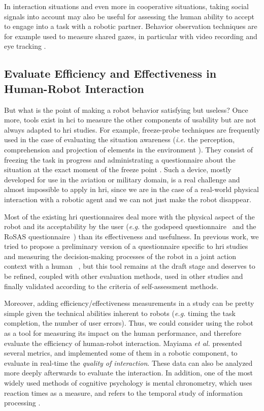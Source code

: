 \documentclass[a4paper,11pt,twoside]{StyleThese}
\begin{document}
In interaction situations and even more in cooperative situations, taking social signals into account may also be useful for assessing the human ability to accept to engage into a task with a robotic partner. Behavior observation techniques are for example used to measure shared gazes, in particular with video recording and eye tracking \cite{gharbi2015toward}.

\subsection{Evaluate Efficiency and Effectiveness in Human-Robot Interaction}
But what is the point of making a robot behavior satisfying but useless? 
Once more, tools exist in \acrshort{hci} to measure the other components of usability but are not always adapted to \acrshort{hri} studies. For example, freeze-probe techniques are frequently used in the case of evaluating the situation awareness (\textit{i.e.} the perception, comprehension and projection of elements in the environment \cite{endsley_design_1988}). They consist of freezing the task in progress and administrating a questionnaire about the situation at the exact moment of the freeze point \cite{salmon2006situation}. Such a device, mostly developed for use in the aviation or military domain, is a real challenge and almost impossible to apply in \acrshort{hri}, since we are in the case of a real-world physical interaction with a robotic agent and we can not just make the robot disappear.

Most of the existing \acrshort{hri} questionnaires deal more with the physical aspect of the robot and its acceptability by the user (\textit{e.g.} the godspeed questionnaire~\cite{bartneck2009measurement} and the RoSAS questionnaire~\cite{carpinella2017robotic}) than its effectiveness and usefulness.
In previous work, we tried to propose a preliminary version of a questionnaire specific to \acrshort{hri} studies and measuring the decision-making processes of the robot in a joint action context with a human~ \cite{devin_evaluating_2018}, but this tool remains at the draft stage and deserves to be refined, coupled with other evaluation methods, used in other studies and finally validated according to the criteria of self-assessment methods.

Moreover, adding efficiency/effectiveness measurements in a study can be pretty simple given the technical abilities inherent to robots (\textit{e.g.} timing the task completion, the number of user errors). Thus, we could consider using the robot as a tool for measuring its impact on the human performance, and therefore evaluate the efficiency of human-robot interaction. Mayiama \textit{et al.} presented several metrics, and implemented some of them in a robotic component, to evaluate in real-time the \textit{quality of interaction}. These data can also be analyzed more deeply afterwards to evaluate the interaction. In addition, one of the most widely used methods of cognitive psychology is mental chronometry, which uses reaction times as a measure, and refers to the temporal study of information processing \cite{posner1978chronometric}.
\end{document}
